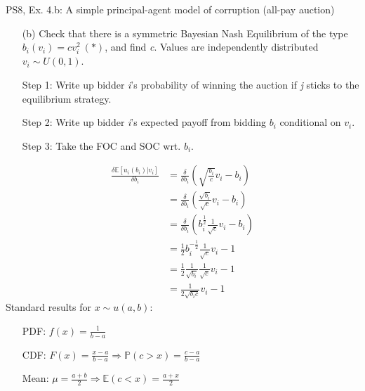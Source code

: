 \begin{frame}{PS8, Ex. 4.b: A simple principal-agent model of corruption (all-pay auction)}
    \begin{itemize}
      \item[(b)] Check that there is a symmetric Bayesian Nash Equilibrium of the type $b_i(v_i) = cv_i^2\ (*)$, and find \textit{c}. Values are independently distributed $v_i\sim U(0, 1)$.
    \end{itemize} \vspace{-8pt}
    \begin{multicols}{2}
      \begin{itemize}
        \item[Step 1:] Write up bidder \textit{i}'s probability of winning the auction if \textit{j} sticks to the equilibrium strategy.
        \item[Step 2:] Write up bidder \textit{i}'s expected payoff from bidding $b_i$ conditional on $v_i$.
        \item[Step 3:] Take the FOC and SOC wrt. $b_i$.
      \end{itemize} \vspace{-8pt}
      \begin{align*}
        \frac{\delta\mathbb{E}[u_i(b_i)|v_i]}{\delta b_i}
          &=\frac{\delta}{\delta b_i}\left(\sqrt{\frac{b_i}{c}}v_i-b_i\right)\\
          &=\frac{\delta}{\delta b_i}\left(\frac{\sqrt{b_i}}{\sqrt{c}}v_i-b_i\right)\\
          &=\frac{\delta}{\delta b_i}\left(b_i^{\frac{1}{2}}\frac{1}{\sqrt{c}}v_i-b_i\right)\\
          &=\frac{1}{2}b_i^{-\frac{1}{2}}\frac{1}{\sqrt{c}}v_i-1\\
          &=\frac{1}{2}\frac{1}{\sqrt{b_i}}\frac{1}{\sqrt{c}}v_i-1\\
          &=\frac{1}{2\sqrt{b_ic}}v_i-1
      \end{align*}
      \vfill\null\columnbreak
      Standard results for $x\sim u(a, b):$ \vspace{-6pt}
      \begin{itemize}
        \item[PDF:] $f(x)=\frac{1}{b-a}$
        \item[CDF:] $F(x)=\frac{x-a}{b-a}\Rightarrow\mathbb{P}(c>x)=\frac{c-a}{b-a}$
        \item[Mean:] $\mu=\frac{a+b}{2}\Rightarrow\mathbb{E}(c<x)=\frac{a+x}{2}$
      \end{itemize}
      \vspace{-6pt}

\end{multicols}
\end{frame}
